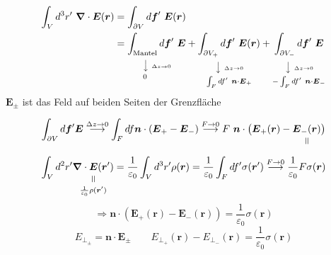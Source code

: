 \documentclass[titlepage,11pt,a4paper,ngerman]{report}
\newcommand{\verteq}{\rotatebox{90}{$\,=$}}
\newcommand{\equalto}[2]{\underset{\scriptstyle\overset{\mkern4mu\verteq}{#2}}{#1}}
\newcommand{\custo}[3]{\underset{\scriptstyle\overset{\mkern4mu\rotatebox{-90}{$\,#1$}}{#3}}{#2}}
\renewcommand{\vec}[1]{\boldsymbol{#1}}
\renewcommand{\epsilon}{\varepsilon}
\newcommand{\vabla}{\boldsymbol{\nabla}}
\begin{document}
\begin{align*}
\int_V d^3 r'\ \vabla \cdot \vec{E}(\vec{r}) &= \int_{\partial V} d\vec{f}'\ \vec{E}(\vec{r})\\
&=\custo{\rotatebox{90}{$\scriptscriptstyle{\Delta z \to 0}$}\atop \longrightarrow}{\int_{\textrm{Mantel}} d\vec{f}'\ \vec{E}}{\hspace{-23.5pt}0} + \custo{\rotatebox{90}{$\scriptscriptstyle{\Delta z \to 0}$}\atop \longrightarrow}{\int_{\partial V_+} d\vec{f}'\ \vec{E}(\vec{r})}{\int_F df'\ \vec{n} \cdot \vec{E}_+} + \custo{\rotatebox{90}{$\scriptscriptstyle{\Delta z \to 0}$}\atop \longrightarrow}{\int_{\partial V_-} d\vec{f}'\ \vec{E}}{- \int_F df'\ \vec{n} \cdot \vec{E}_-}
\end{align*}
$ \vec{E}_{\pm} $ ist das Feld auf beiden Seiten der Grenzfläche

\begin{equation*}
\int_{\partial V} d\vec{f}' \vec{E} \buildrel \Delta z \to 0 \over \longrightarrow \int_{F} df \vec{n} \cdot (\vec{E}_+ - \vec{E}_-) \buildrel F \to 0 \over \longrightarrow F\  \vec{n} \cdot \big(\vec{E}_+(\vec{r}) - \equalto{\vec{E}_-(\vec{r})}{}\big)
\end{equation*}
\begin{equation*}
\int_V d^2r' \equalto{\vec{\nabla} \cdot \vec{E}(\vec{r}')}{\frac{1}{\epsilon_0} \rho(\vec{r}')} = \frac{1}{\epsilon_0} \int_V d^3r' \rho(\vec{r}) = \frac{1}{\epsilon_0} \int_F df'  \sigma(\vec{r}') \buildrel F \to 0 \over \longrightarrow \frac{1}{\epsilon_0} F \sigma(\vec{r})
\end{equation*}
\begin{equation*}
\Rightarrow \vec{n} \cdot \left(\vec{E}_+(\vec{r}) - \vec{E}_-(\vec{r}) \right) = \frac{1}{\epsilon_0} \sigma(\vec{r})
\end{equation*}
\begin{equation*}
E_{\perp_\pm} = \vec{n} \cdot \vec{E}_{\pm} \qquad E_{\perp_+}(\vec{r}) - E_{\perp_-} (\vec{r}) = \frac{1}{\epsilon_0} \sigma(\vec{r})
\end{equation*}

\end{document}
